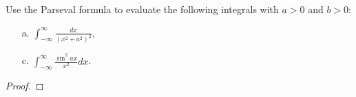 \begin{problem}{2.23}
  Use the Parseval formula to evaluate the following integrals with $a >0$ and $b >0$:
  \begin{enumerate}
    \item[a.] $\displaystyle \int_{-\infty}^\infty \frac{dx}{(x^2 + a^2)^2}$,
    \item[c.] $\displaystyle \int_{-\infty}^\infty \frac{\sin^2 ax}{x^2}dx$.
  \end{enumerate}
\end{problem}

\begin{proof}
\end{proof}
\newpage

